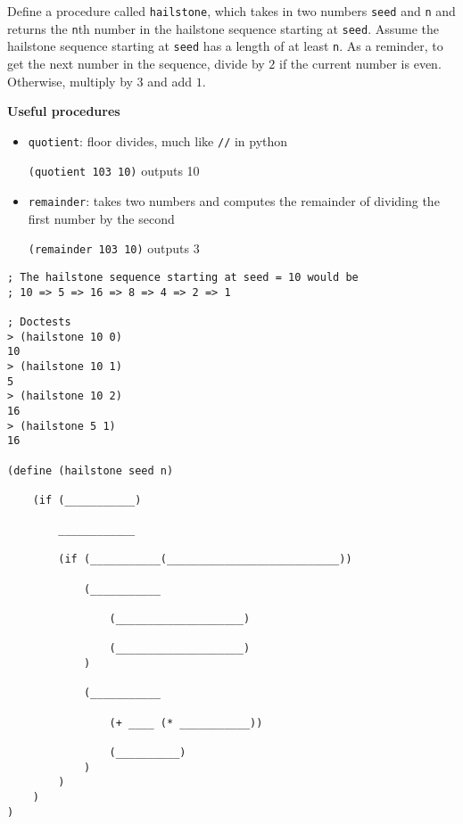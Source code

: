 \begin{blocksection}
\question Define a procedure called \lstinline$hailstone$,
which takes in two numbers \lstinline$seed$ and \lstinline$n$ and returns the
\lstinline$n$th number in the hailstone sequence starting at \lstinline$seed$.
Assume the hailstone sequence starting at \lstinline$seed$ has a length of at least
\lstinline$n$. As a reminder, to get the next number in the sequence, divide by $2$ if the current number is even. Otherwise, multiply by $3$ and add $1$.

\textbf{Useful procedures}

\begin{itemize}
\item \lstinline$quotient$: floor divides, much like \lstinline$//$ in python

\lstinline$(quotient 103 10)$ outputs 10

\item \lstinline$remainder$: takes two numbers and computes the remainder of dividing the first number by the second

\lstinline$(remainder 103 10)$ outputs 3
\end{itemize}

\vspace{\baselineskip}
\begin{lstlisting}
; The hailstone sequence starting at seed = 10 would be
; 10 => 5 => 16 => 8 => 4 => 2 => 1

; Doctests
> (hailstone 10 0)
10
> (hailstone 10 1)
5
> (hailstone 10 2)
16
> (hailstone 5 1)
16

(define (hailstone seed n)

    (if (___________)

        ____________

        (if (___________(___________________________))

            (___________

                (____________________)

                (____________________)
            )

            (___________

                (+ ____ (* ___________))

                (__________)
            )
        )
    )
)
\end{lstlisting}
\end{blocksection}

